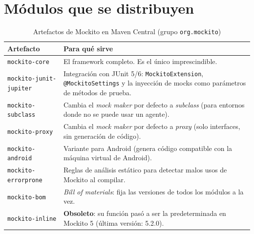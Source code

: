 \documentclass[11pt,a4paper,oneside]{report}
\newcommand{\code}[1]{\texttt{#1}}
\begin{document}
\section{Módulos que se distribuyen}
\begin{table}[H]
\centering
\caption{Artefactos de Mockito en Maven Central (grupo \code{org.mockito})}
\begin{tabularx}{\linewidth}{lX}
\toprule
\textbf{Artefacto} & \textbf{Para qué sirve}\\
\midrule
\code{mockito-core} & El framework completo. Es el único imprescindible.\\
\code{mockito-junit-jupiter} & Integración con JUnit 5/6: \code{MockitoExtension}, \code{@MockitoSettings} y la inyección de mocks como parámetros de métodos de prueba.\\
\code{mockito-subclass} & Cambia el \emph{mock maker} por defecto a \emph{subclass} (para entornos donde no se puede usar un agente).\\
\code{mockito-proxy} & Cambia el \emph{mock maker} por defecto a \emph{proxy} (solo interfaces, sin generación de código).\\
\code{mockito-android} & Variante para Android (genera código compatible con la máquina virtual de Android).\\
\code{mockito-errorprone} & Reglas de análisis estático para detectar malos usos de Mockito al compilar.\\
\code{mockito-bom} & \emph{Bill of materials}: fija las versiones de todos los módulos a la vez.\\
\code{mockito-inline} & \textbf{Obsoleto}: su función pasó a ser la predeterminada en Mockito 5 (última versión: 5.2.0).\\
\bottomrule
\end{tabularx}
\end{table}
\end{document}
